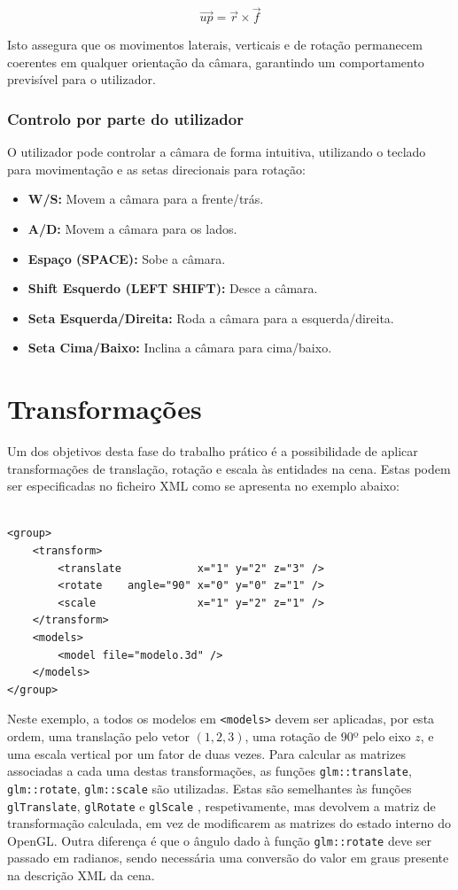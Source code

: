 \documentclass[12pt, a4paper]{article}
\begin{document}
\[
    \vec{up} = \vec{r} \times \vec{f}
\]

Isto assegura que os movimentos laterais, verticais e de rotação permanecem coerentes em
qualquer orientação da câmara, garantindo um comportamento previsível para o utilizador.

\subsubsection{Controlo por parte do utilizador}

O utilizador pode controlar a câmara de forma intuitiva, utilizando o teclado para movimentação
e as setas direcionais para rotação:

\begin{itemize}
    \item \textbf{W/S:} Movem a câmara para a frente/trás.
    \item \textbf{A/D:} Movem a câmara para os lados.
    \item \textbf{Espaço (SPACE):} Sobe a câmara.
    \item \textbf{Shift Esquerdo (LEFT SHIFT):} Desce a câmara.
    \item \textbf{Seta Esquerda/Direita:} Roda a câmara para a esquerda/direita.
    \item \textbf{Seta Cima/Baixo:} Inclina a câmara para cima/baixo.
\end{itemize}

\section{Transformações}

Um dos objetivos desta fase do trabalho prático é a possibilidade de aplicar transformações de
translação, rotação e escala às entidades na cena. Estas podem ser especificadas no ficheiro XML
como se apresenta no exemplo abaixo:

\lstset{language=xml}
\begin{lstlisting}

<group>
    <transform>
		<translate            x="1" y="2" z="3" />
        <rotate    angle="90" x="0" y="0" z="1" />
		<scale                x="1" y="2" z="1" />
    </transform>
    <models>
        <model file="modelo.3d" />
    </models>
</group>
\end{lstlisting}

Neste exemplo, a todos os modelos em \texttt{<models>} devem ser aplicadas, por esta ordem, uma
translação pelo vetor $(1, 2, 3)$, uma rotação de 90º pelo eixo $z$, e uma escala vertical por um
fator de duas vezes. Para calcular as matrizes associadas a cada uma destas transformações, as
funções \texttt{glm::translate}, \texttt{glm::rotate}, \texttt{glm::scale} são utilizadas.
\cite{glm-transform} Estas são semelhantes às funções \texttt{glTranslate}, \texttt{glRotate} e
\texttt{glScale} \cite{gl-transforms}, respetivamente, mas devolvem a matriz de transformação
calculada, em vez de modificarem as matrizes do estado interno do OpenGL. Outra diferença é que o
ângulo dado à função \texttt{glm::rotate} deve ser passado em radianos, sendo necessária uma
conversão do valor em graus presente na descrição XML da cena.
\end{document}
